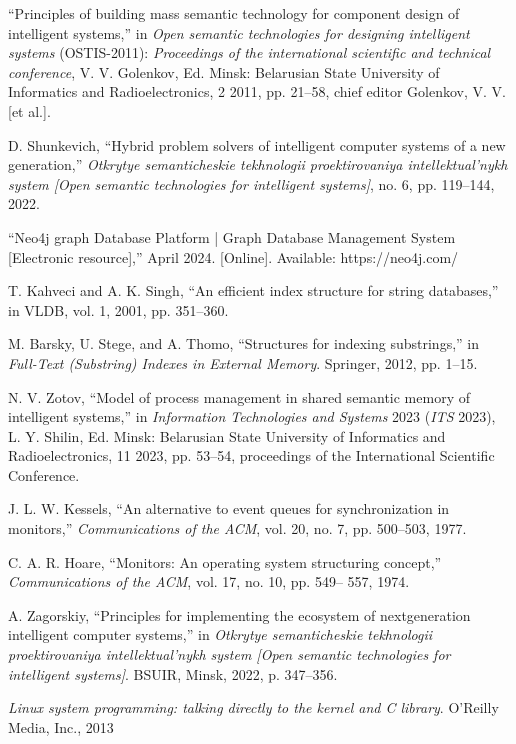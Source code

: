\documentclass[10pt]{article}
\begin{document}
\begin{thebibliography}{99}
 “Principles of building mass semantic technology for component
design of intelligent systems,” in \textit{Open semantic technologies
for designing intelligent systems} (OSTIS-2011): \textit{Proceedings
of the international scientific and technical conference}, V. V.
Golenkov, Ed. Minsk: Belarusian State University of Informatics
and Radioelectronics, 2 2011, pp. 21–58, chief editor Golenkov,
V. V. [et al.].

D. Shunkevich, “Hybrid problem solvers of intelligent computer
systems of a new generation,” \textit{Otkrytye semanticheskie tekhnologii
proektirovaniya intellektual’nykh system [Open semantic technologies
for intelligent systems]}, no. 6, pp. 119–144, 2022.

“Neo4j graph Database Platform | Graph Database Management
System [Electronic resource],” April 2024. [Online]. Available:
https://neo4j.com/

T. Kahveci and A. K. Singh, “An efficient index structure for
string databases,” in VLDB, vol. 1, 2001, pp. 351–360.

M. Barsky, U. Stege, and A. Thomo, “Structures for indexing
substrings,” in \textit{Full-Text (Substring) Indexes in External Memory}.
Springer, 2012, pp. 1–15.

N. V. Zotov, “Model of process management in shared semantic
memory of intelligent systems,” in \textit{Information Technologies and
Systems} 2023 (\textit{ITS} 2023), L. Y. Shilin, Ed. Minsk: Belarusian
State University of Informatics and Radioelectronics, 11 2023, pp.
53–54, proceedings of the International Scientific Conference.

J. L. W. Kessels, “An alternative to event queues for synchronization
in monitors,” \textit{Communications of the ACM}, vol. 20, no. 7,
pp. 500–503, 1977.

C. A. R. Hoare, “Monitors: An operating system structuring
concept,” \textit{Communications of the ACM}, vol. 17, no. 10, pp. 549–
557, 1974.

A. Zagorskiy, “Principles for implementing the ecosystem of nextgeneration
intelligent computer systems,” in \textit{Otkrytye semanticheskie
tekhnologii proektirovaniya intellektual’nykh system [Open
semantic technologies for intelligent systems]}. BSUIR, Minsk,
2022, p. 347–356.

\textit{Linux system programming: talking directly to the kernel
and C library}. O’Reilly Media, Inc., 2013


\end{thebibliography}
\end{document}
